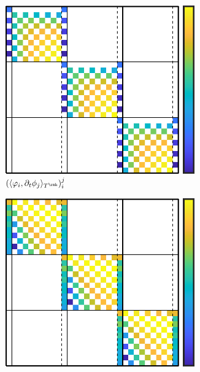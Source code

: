 \begin{example}
        \begin{figure}[!ht]
            \centering
            \begin{subfigure}{0.5\textwidth}
                \centering
                \includegraphics[width = 0.9\textwidth]{3 - fluid component/2 - structure preservation/2 - FET/1 - heat equation/images/matrix 1.png}
                \caption{$(\langle\varphi_{i}, \partial_{t}\phi_{j}\rangle_{T^{\rmh}})^{j}_{i}$}
            \end{subfigure}%
            \begin{subfigure}{0.5\textwidth}
                \centering
                \includegraphics[width = 0.9\textwidth]{3 - fluid component/2 - structure preservation/2 - FET/1 - heat equation/images/matrix 2.png}

\end{subfigure}
\end{figure}
\end{example}

